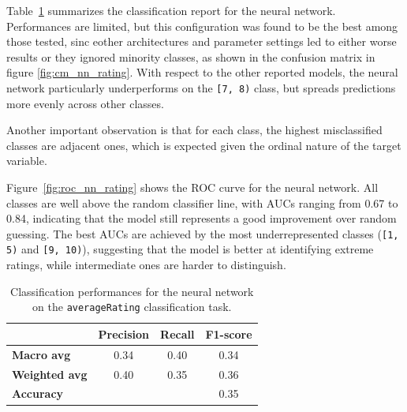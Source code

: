 Table~\ref{tab:nn_report_rating} summarizes the classification
report for the neural network.
Performances are limited, but this configuration was found to
be the best among those tested, sinc eother architectures and
parameter settings led to either worse results or they ignored
minority classes, as shown in the confusion matrix in figure
\ref{fig:cm_nn_rating}. With respect to the other reported models,
the neural network particularly underperforms on the \texttt{[7, 8)}
class, but spreads predictions more evenly across other classes.

Another important observation is that for each class, the highest
misclassified classes are adjacent ones,
which is expected given the ordinal nature of the target variable.

Figure~\ref{fig:roc_nn_rating} shows the ROC curve for the neural
network. All classes are well above the random classifier line,
with AUCs ranging from 0.67 to 0.84, indicating that the model
still represents a good improvement over random guessing.
The best AUCs are achieved by the most underrepresented classes
(\texttt{[1, 5)} and \texttt{[9, 10)}), suggesting that
the model is better at identifying extreme ratings, while
intermediate ones are harder to distinguish.

\begin{table}[H]
    \centering
    \begin{tabular}{lccc}
    \hline
     & \textbf{Precision} & \textbf{Recall} & \textbf{F1-score}\\
    \hline
    \textbf{Macro avg}   & 0.34 & 0.40 & 0.34 \\
    \textbf{Weighted avg}& 0.40 & 0.35 & 0.36 \\
    \hline
    \textbf{Accuracy}    & & & 0.35 \\
    \hline
    \end{tabular}
    \caption{Classification performances for the neural network on the \texttt{averageRating} classification task.}
    \label{tab:nn_report_rating}
\end{table}


